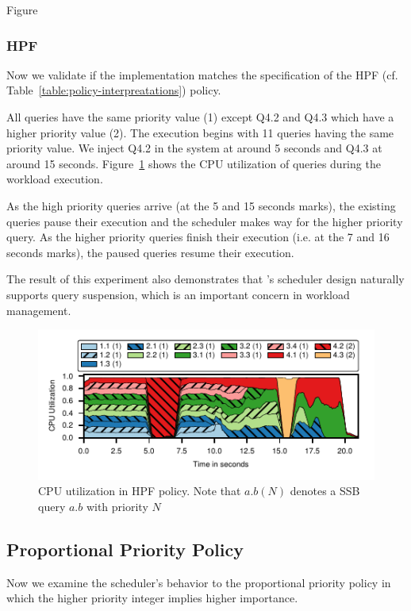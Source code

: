 Figure 
\subsubsection{HPF}
Now we validate if the implementation matches the 
specification of the HPF (cf. Table~\ref{table:policy-interpreatations}) policy.

All queries have the same priority value (1) except Q4.2 and Q4.3 which have a higher priority value (2). 
The execution begins with 11 queries having the same priority value. %
We inject Q4.2 in the system at around 5 seconds and Q4.3 at around 15 seconds.
Figure~\ref{fig:hpf-all} shows the CPU utilization of queries during the workload 
execution.

As the high priority queries arrive (at the 5 and 15 seconds marks), the existing queries pause their execution and the scheduler makes way for the higher priority query.
As the higher priority queries finish their execution (i.e. at the 7 and 16 seconds marks), the paused queries resume their execution.

The result of this experiment also demonstrates that \sys{}'s scheduler design naturally supports query suspension, which is an important concern in workload management. 

\begin{figure}[t]
	\centering
	\includegraphics[width=\columnwidth]{policy/figures/ssb-hpf-all.pdf}
	\caption{CPU utilization in HPF policy. Note that $a.b  (N)$ denotes a SSB query $a.b$ with priority $N$}
	\label{fig:hpf-all}
\end{figure}

\subsection{Proportional Priority Policy}
Now we examine the scheduler's behavior to the proportional priority policy %
in which the higher priority integer implies higher importance.

